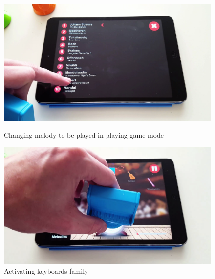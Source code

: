 \begin{figure}[ht!]
  \centering
  \includegraphics[width=350pt]{graphics/game-play/change_melody_conducting.png}
  \vspace{0.05cm}
  \caption{Changing melody to be played in playing game mode}
  \vspace{1cm}

  \includegraphics[width=350pt]{graphics/game-play/activate_keyboards_family.png}
  \vspace{0.05cm}
  \caption{Activating keyboards family}
\end{figure}

